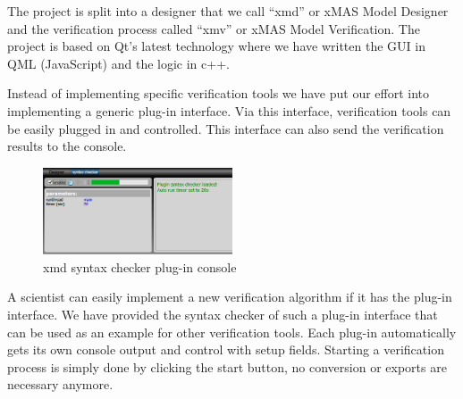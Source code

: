 The project is split into a designer that we call
``xmd'' or xMAS Model Designer and the verification process called ``xmv'' or
xMAS Model Verification. The project is based on Qt's latest technology where we
have written the GUI in QML (JavaScript) and the logic in c++.

Instead of implementing specific verification tools we have put our effort into
implementing a generic plug-in interface. Via this interface, verification tools
can be easily plugged in and controlled. This interface can also send the
verification results to the console.
\begin{figure}
  \vspace{-20pt}
  \begin{center}
    \includegraphics[width=0.50\textwidth]{console}
  \end{center}
  \vspace{-20pt}
  \caption{xmd syntax checker plug-in console}
  \label{fig:console}
  \vspace{-10pt}
\end{figure}
A scientist can easily implement a new verification algorithm if it has the
plug-in interface. We have provided the syntax checker of such a plug-in interface
that can be used as an example for other verification tools. Each plug-in
automatically gets its own console output and control with setup fields.
Starting a verification process is simply done by clicking the start button, no
conversion or exports are necessary anymore.


